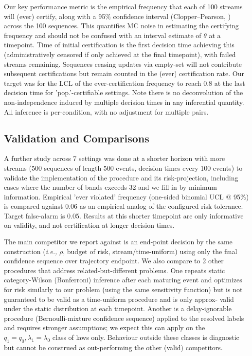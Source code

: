 Our key performance metric is the empirical frequency that each of 100 streams will (ever) certify, along with a 95\% confidence interval (Clopper--Pearson, \citep{clopper1934}) across the 100 sequences. This quantifies MC noise in estimating the certifying frequency and should not be confused with an interval estimate of $\theta$ at a timepoint. Time of initial certification is the first decision time achieving this (administratively censored if only achieved at the final timepoint), with failed streams remaining. Sequences ceasing updates via empty-set will not contribute subsequent certifications but remain counted in the (ever) certification rate. Our target was for the LCL of the ever-certification frequency to reach 0.8 at the last decision time for 'pop.'-certifiable settings. Note there is no deconvolution of the non-independence induced by multiple decision times in any inferential quantity. All inference is per-condition, with no adjustment for multiple pairs.

\subsection{Validation and Comparisons} 
A further study across 7 settings was done at a shorter horizon with more streams (500 sequences of length 500 events, decision times every 100 events) to validate the implementation of the procedure and its risk-projection, including cases where the number of bands exceeds 32 and we fill in by minimum information. Empirical 'ever violated' frequency (one-sided binomial UCL @ 95\%) is compared against 0.06 as an empirical analog of the configured risk tolerance. Target false-alarm is 0.05. Results at this shorter timepoint are only informative on validity, and not certification at longer decision times.

The main competitor we report against is an end-point decision by the same construction (\emph{i.e.,} $\rho$, budget of risk, stream/time-uniform) using only the final confidence sequence over trajectory endpoint. We also compare to 2 other procedures that address related-but-different problems. One repeats static category-Wilson (Bonferroni) inference after each maturing event and optimizes for risk similarly to our problem (using the same sensitivity function) but is not guaranteed to be valid as a time-uniform procedure and is only approx- valid under the static distribution at each timepoint. Another is a delay-ignorable procedure (Bernoulli-mixture confidence sequence) applied to the resolved labels and requires stronger assumptions; we expect this can apply on the $q_1=q_0, \lambda_1 = \lambda_0$ class of laws only. Behaviour outside these classes is diagnostic but cannot be construed as out-performing the other (valid) competitors.

